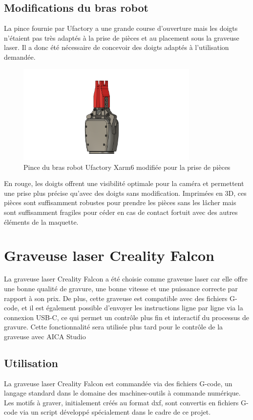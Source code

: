 \subsection{Modifications du bras robot}
La pince fournie par Ufactory a une grande course d'ouverture mais les doigts n'étaient pas très adaptés à la prise de pièces et au placement sous la graveuse laser. Il a donc été nécessaire de concevoir des doigts adaptés à l'utilisation demandée.
\begin{figure}[H]
    \centering
    \includegraphics[width=0.8\textwidth]{assets/figures/Pince_Xarm6.png}
    \caption{Pince du bras robot Ufactory Xarm6 modifiée pour la prise de pièces}
    \label{fig:pince_robot}
\end{figure}

En rouge, les doigts offrent une visibilité optimale pour la caméra et permettent une prise plus précise qu'avec des doigts sans modification. Imprimées en 3D, ces pièces sont suffisamment robustes pour prendre les pièces sans les lâcher mais sont suffisamment fragiles pour céder en cas de contact fortuit avec des autres éléments de la maquette.

\section{Graveuse laser Creality Falcon}

La graveuse laser Creality Falcon a été choisie comme graveuse laser car elle offre une bonne qualité de gravure, une bonne vitesse et une puissance correcte par rapport à son prix. De plus, cette graveuse est compatible avec des fichiers G-code, et il est également possible d'envoyer les instructions ligne par ligne via la connexion USB-C, ce qui permet un contrôle plus fin et interactif du processus de gravure. Cette fonctionnalité sera utilisée plus tard pour le contrôle de la graveuse avec AICA Studio

\subsection{Utilisation}
La graveuse laser Creality Falcon est commandée via des fichiers G-code, un langage standard dans le domaine des machines-outils à commande numérique. Les motifs à graver, initialement créés au format \gls{dxf}, sont convertis en fichiers G-code via un script développé spécialement dans le cadre de ce projet.

